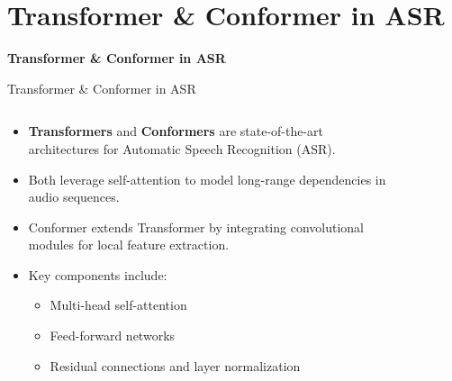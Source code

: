 \section{Transformer \& Conformer in ASR}

\begin{frame}{}
    \LARGE \textbf{Transformer \& Conformer in ASR}
\end{frame}

\begin{frame}{Transformer \& Conformer in ASR}
    \begin{columns}
        \begin{column}{0.55\textwidth}
            \begin{itemize}
                \setlength{\itemsep}{1em}
                \item \textbf{Transformers} and \textbf{Conformers} are state-of-the-art architectures for Automatic Speech Recognition (ASR).
                \item Both leverage self-attention to model long-range dependencies in audio sequences.
                \item Conformer extends Transformer by integrating convolutional modules for local feature extraction.
                \item Key components include:
                    \begin{itemize}
                        \item Multi-head self-attention
                        \item Feed-forward networks
                        \item Residual connections and layer normalization
                    \end{itemize}
            \end{itemize}
        \end{column}
        \begin{column}{0.45\textwidth}
            \begin{figure}[h]
                \centering

\end{figure}
\end{column}
\end{columns}
\end{frame}
